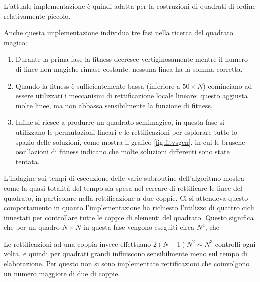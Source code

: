 \documentclass[italian,twoside,twocolumn]{article}
\begin{document}
L'attuale implementazione è quindi adatta per la costruzioni di quadrati di ordine relativamente piccolo.

Anche questa implementazione individua tre fasi nella ricerca del quadrato magico:
\begin{enumerate}
	\item Durante la prima fase la fitness decresce vertiginosamente mentre il numero di linee non magiche rimase costante: nessuna linea ha la somma corretta.
	\item Quando la fitness è sufficientemente bassa (inferiore a $ 50 \times N $) cominciano ad essere utilizzati i meccanismi di rettificazione locale lineare: questo aggiusta molte linee, ma non abbassa sensibilmente la funzione di fitness.
	\item Infine si riesce a produrre un quadrato semimagico, in questa fase si utilizzano le permutazioni lineari e le rettificazioni per esplorare tutto lo spazio delle soluzioni, come mostra il grafico \ref{fig:fitvsgen}, in cui le brusche oscillazioni di fitness indicano che molte soluzioni differenti sono state tentata. 
\end{enumerate}

L'indagine sui tempi di esecuzione delle varie subroutine dell'algoritmo mostra come la quasi totalità del tempo sia spesa nel cercare di rettificare le linee del quadrato, in particolare nella rettificazione a due coppie. Ci si attendeva questo comportamento in quanto l'implementazione ha richiesto l'utilizzo di quattro cicli innestati per controllare tutte le coppie di elementi del quadrato. Questo significa che per un quadro $ N\times N $ in questa fase vengono eseguiti circa $ N^4 $, che 

Le rettificazioni ad una coppia invece effettuano $ 2(N-1)N^2 \sim N^3 $ controlli ogni volta, e quindi per quadrati grandi influiscono sensibilmente meno sul tempo di elaborazione. Per questo non si sono implementate rettificazioni che coinvolgono un numero maggiore di due di coppie.
\end{document}
